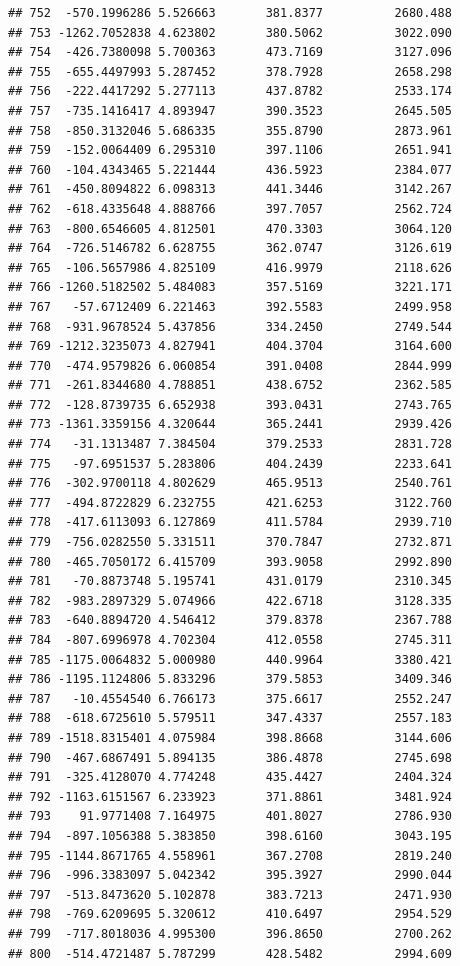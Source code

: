 \documentclass[
]{article}
\begin{document}
\begin{verbatim}
## 752  -570.1996286 5.526663       381.8377          2680.488
## 753 -1262.7052838 4.623802       380.5062          3022.090
## 754  -426.7380098 5.700363       473.7169          3127.096
## 755  -655.4497993 5.287452       378.7928          2658.298
## 756  -222.4417292 5.277113       437.8782          2533.174
## 757  -735.1416417 4.893947       390.3523          2645.505
## 758  -850.3132046 5.686335       355.8790          2873.961
## 759  -152.0064409 6.295310       397.1106          2651.941
## 760  -104.4343465 5.221444       436.5923          2384.077
## 761  -450.8094822 6.098313       441.3446          3142.267
## 762  -618.4335648 4.888766       397.7057          2562.724
## 763  -800.6546605 4.812501       470.3303          3064.120
## 764  -726.5146782 6.628755       362.0747          3126.619
## 765  -106.5657986 4.825109       416.9979          2118.626
## 766 -1260.5182502 5.484083       357.5169          3221.171
## 767   -57.6712409 6.221463       392.5583          2499.958
## 768  -931.9678524 5.437856       334.2450          2749.544
## 769 -1212.3235073 4.827941       404.3704          3164.600
## 770  -474.9579826 6.060854       391.0408          2844.999
## 771  -261.8344680 4.788851       438.6752          2362.585
## 772  -128.8739735 6.652938       393.0431          2743.765
## 773 -1361.3359156 4.320644       365.2441          2939.426
## 774   -31.1313487 7.384504       379.2533          2831.728
## 775   -97.6951537 5.283806       404.2439          2233.641
## 776  -302.9700118 4.802629       465.9513          2540.761
## 777  -494.8722829 6.232755       421.6253          3122.760
## 778  -417.6113093 6.127869       411.5784          2939.710
## 779  -756.0282550 5.331511       370.7847          2732.871
## 780  -465.7050172 6.415709       393.9058          2992.890
## 781   -70.8873748 5.195741       431.0179          2310.345
## 782  -983.2897329 5.074966       422.6718          3128.335
## 783  -640.8894720 4.546412       379.8378          2367.788
## 784  -807.6996978 4.702304       412.0558          2745.311
## 785 -1175.0064832 5.000980       440.9964          3380.421
## 786 -1195.1124806 5.833296       379.5853          3409.346
## 787   -10.4554540 6.766173       375.6617          2552.247
## 788  -618.6725610 5.579511       347.4337          2557.183
## 789 -1518.8315401 4.075984       398.8668          3144.606
## 790  -467.6867491 5.894135       386.4878          2745.698
## 791  -325.4128070 4.774248       435.4427          2404.324
## 792 -1163.6151567 6.233923       371.8861          3481.924
## 793    91.9771408 7.164975       401.8027          2786.930
## 794  -897.1056388 5.383850       398.6160          3043.195
## 795 -1144.8671765 4.558961       367.2708          2819.240
## 796  -996.3383097 5.042342       395.3927          2990.044
## 797  -513.8473620 5.102878       383.7213          2471.930
## 798  -769.6209695 5.320612       410.6497          2954.529
## 799  -717.8018036 4.995300       396.8650          2700.262
## 800  -514.4721487 5.787299       428.5482          2994.609
\end{verbatim}
\end{document}
